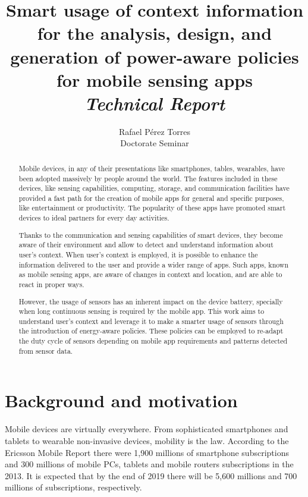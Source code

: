 \documentclass{report}
\title{Smart usage of context information for the analysis, design, and generation of power-aware policies for mobile sensing apps\\[0.2cm]\small\emph{Technical Report}}
\author{Rafael Pérez Torres\\\small Doctorate Seminar}
\date{}
\begin{document}
\maketitle

\begin{abstract}
Mobile devices, in any of their presentations like smartphones, tables, wearables, have been adopted massively by people around the world.
The features included in these devices, like sensing capabilities, computing, storage, and communication facilities have provided a fast path for the creation of mobile apps for general and specific purposes, like entertainment or productivity.
The popularity of these apps have promoted smart devices to ideal partners for every day activities.

Thanks to the communication and sensing capabilities of smart devices, they become aware of their environment and allow to detect and understand information about user's context.
When user's context is employed, it is possible to enhance the information delivered to the user and provide a wider range of apps. Such apps, known as mobile sensing apps, are aware of changes in context and location, and are able to react in proper ways.

However, the usage of sensors has an inherent impact on the device battery, specially when long continuous sensing is required by the mobile app.
This work aims to understand user's context and leverage it to make a smarter usage of sensors through the introduction of energy-aware policies.
These policies can be employed to re-adapt the duty cycle of sensors depending on mobile app requirements and patterns detected from sensor data.
\end{abstract}


\chapter*{Background and motivation}
Mobile devices are virtually everywhere.
From sophisticated smartphones and tablets to wearable non-invasive devices, mobility is the law.
According to the Ericsson Mobile Report \citep{Ericson2014} there were 1,900 millions of smartphone subscriptions and 300 millions of mobile PCs, tablets and mobile routers subscriptions in the 2013.
It is expected that by the end of 2019 there will be 5,600 millions and 700 millions of subscriptions, respectively.
\end{document}
